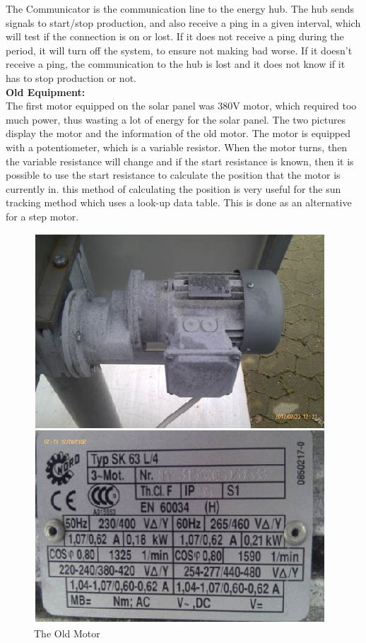 \documentclass[12pt,a4paper]{report}
\begin{document}
The Communicator is the communication line to the energy hub. The hub sends signals to start/stop production, and also receive a ping in a given interval, which will test if the connection is on or lost. If it does not receive a ping during the period, it will turn off the system, to ensure not making bad worse. If it doesn't receive a ping, the communication to the hub is lost and it does not know if it has to stop production or not.\\


\newpage \textbf{Old Equipment:}\\
The first motor equipped on the solar panel was 380V motor, which required too much power, thus wasting a lot of energy for the solar panel. The two pictures display the motor and the information of the old motor. The motor is equipped with a potentiometer, which is a variable resistor. When the motor turns, then the variable resistance will change and if the start resistance is known, then it is possible to use the start resistance to calculate the position that the motor is currently in. this method of calculating the position is very useful for the sun tracking method which uses a look-up data table. This is done as an alternative for a step motor.

\begin{figure}
  \begin{center}
    \includegraphics[scale=0.75]{images/oldmotor.jpg}
  \end{center}
  \caption{The Old Motor}
\end{figure}

\end{document}
